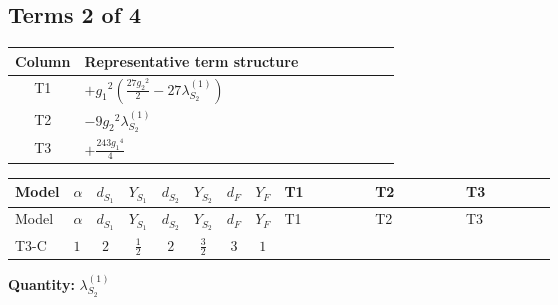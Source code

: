 \documentclass[8pt]{article}
\begin{document}
\begin{landscape}
\subsection*{Terms 2 of 4}
\begin{center}
\begin{tabular}{@{}c >{\raggedright\arraybackslash}p{0.82\linewidth}@{}}
\toprule
Column & Representative term structure \\
\midrule
T1 & \(\displaystyle +{g_1}^2 \left(\frac{27 {g_2}^2}{2}-27 {\lambda_{S_2}^{(1)}}\right)\) \\
\midrule
T2 & \(\displaystyle -9 {g_2}^2 {\lambda_{S_2}^{(1)}}\) \\
\midrule
T3 & \(\displaystyle +\frac{243 {g_1}^4}{4}\) \\
\midrule
\bottomrule
\end{tabular}
\end{center}
\smallskip
\tiny
\begin{longtable}{@{}llcccccc >{\raggedright\arraybackslash}p{0.21\linewidth} >{\raggedright\arraybackslash}p{0.21\linewidth} >{\raggedright\arraybackslash}p{0.21\linewidth}@{}}
\toprule
Model & $\alpha$ & $d_{S_1}$ & $Y_{S_1}$ & $d_{S_2}$ & $Y_{S_2}$ & $d_F$ & $Y_F$ & T1 & T2 & T3 \\
\midrule
\endfirsthead
\toprule
Model & $\alpha$ & $d_{S_1}$ & $Y_{S_1}$ & $d_{S_2}$ & $Y_{S_2}$ & $d_F$ & $Y_F$ & T1 & T2 & T3 \\
\midrule
\endhead
T3-C & $1$ & $2$ & $\frac{1}{2}$ & $2$ & $\frac{3}{2}$ & $3$ & $1$ & \scriptsize\adjustbox{max width=\linewidth}{$\begin{gathered} +{g_1}^2 \left(\frac{27 {g_2}^2}{2}-27 {\lambda_{S_2}^{(1)}}\right)\end{gathered}$} & \scriptsize\adjustbox{max width=\linewidth}{$\begin{gathered} -9 {g_2}^2 {\lambda_{S_2}^{(1)}}\end{gathered}$} & \scriptsize\adjustbox{max width=\linewidth}{$\begin{gathered} +\frac{243 {g_1}^4}{4}\end{gathered}$} \\
\midrule
\bottomrule
\end{longtable}
\clearpage
\noindent\textbf{Quantity: }$\lambda_{S_2}^{(1)}$\par\smallskip

\end{landscape}
\end{document}

